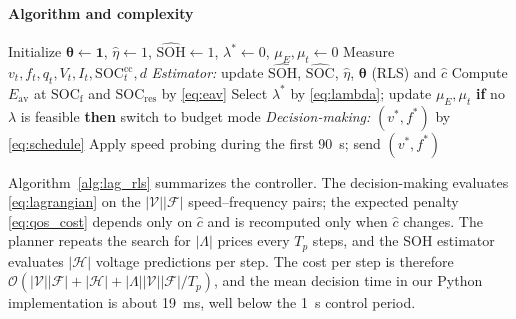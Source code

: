 \paragraph{Algorithm and complexity}
\begin{algorithm}[t]
\caption{DARO (Lag-RLS for $w_D = 0$)}
\label{alg:lag_rls}
\begin{algorithmic}[1]
\State Initialize $\boldsymbol\theta \gets \mathbf 1$, $\hat\eta \gets 1$, $\widehat{\mathrm{SOH}} \gets 1$, $\lambda^\ast \gets 0$, $\mu_E, \mu_t \gets 0$
  \State Measure $v_t, f_t, q_t, V_t, I_t, \mathrm{SOC}^{\mathrm{cc}}_t, d$
  \State \emph{Estimator:} update $\widehat{\mathrm{SOH}}$, $\widehat{\mathrm{SOC}}$, $\hat\eta$, $\boldsymbol\theta$ (\ac{RLS}) and $\hat c$
   
    \State Compute $E_{\mathrm{av}}$ at $\mathrm{SOC}_{\mathrm{f}}$ and $\mathrm{SOC}_{\mathrm{res}}$ by \eqref{eq:eav}
    \State Select $\lambda^\ast$ by \eqref{eq:lambda}; update $\mu_E, \mu_t$
    \State \textbf{if} no $\lambda$ is feasible \textbf{then} switch to budget mode
  \EndIf
  \State \emph{Decision-making:} $(v^\ast, f^\ast)$ by \eqref{eq:schedule}
  \State Apply speed probing during the first 90~s; send $(v^\ast, f^\ast)$
\EndFor
\end{algorithmic}
\end{algorithm}
Algorithm~\ref{alg:lag_rls} summarizes the controller. The decision-making evaluates
\eqref{eq:lagrangian} on the $|\mathcal{V}||\mathcal{F}|$ speed--frequency pairs; the expected
penalty \eqref{eq:qos_cost} depends only on $\hat c$ and is recomputed only when $\hat c$ changes.
The planner repeats the search for $|\Lambda|$ prices every $T_p$ steps, and the \ac{SOH} estimator
evaluates $|\mathcal{H}|$ voltage predictions per step. The cost per step is therefore
$\mathcal{O}(|\mathcal{V}||\mathcal{F}| + |\mathcal{H}| + |\Lambda||\mathcal{V}||\mathcal{F}|/T_p)$, and the mean
decision time in our Python implementation is about 19~ms, well below the 1~s control period.
